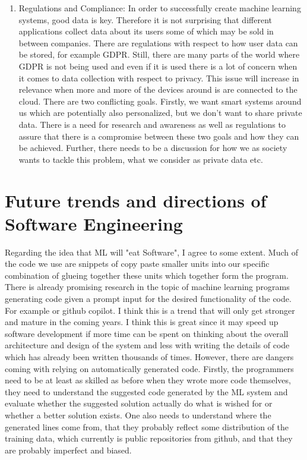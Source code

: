 \documentclass{article}
\begin{document}
\begin{enumerate}
    \item Regulations and Compliance:
    In order to successfully create machine learning systems, good data is key. Therefore it is not surprising that different applications collect data about its users some of which may be sold in between companies. There are regulations with respect to how user data can be stored, for example GDPR. Still, there are many parts of the world where GDPR is not being used and even if it is used there is a lot of concern when it comes to data collection with respect to privacy. This issue will increase in relevance when more and more of the devices around is are connected to the cloud. There are two conflicting goals. Firstly, we want smart systems around us which are potentially also personalized, but we don't want to share private data. There is a need for research and awareness as well as regulations to assure that there is a compromise between these two goals and how they can be achieved. Further, there needs to be a discussion for how we as society wants to tackle this problem, what we consider as private data etc.
    
\end{enumerate}

\section{Future trends and directions of Software Engineering}
Regarding the idea that ML will "eat Software", I agree to some extent. Much of the code we use are snippets of copy paste smaller units into our specific combination of glueing together these units which together form the program. There is already promising research in the topic of machine learning programs generating code given a prompt input for the desired functionality of the code. For example \cite{codex} or github copilot. I think this is a trend that will only get stronger and mature in the coming years. I think this is great since it may speed up software development if more time can be spent on thinking about the overall architecture and design of the system and less with writing the details of code which has already been written thousands of times. However, there are dangers coming with relying on automatically generated code. Firstly, the programmers need to be at least as skilled as before when they wrote more code themselves, they need to understand the suggested code generated by the ML system and evaluate whether the suggested solution actually do what is wished for or whether a better solution exists. One also needs to understand where the generated lines come from, that they probably reflect some distribution of the training data, which currently is public repositories from github, and that they are probably imperfect and biased.
\end{document}
